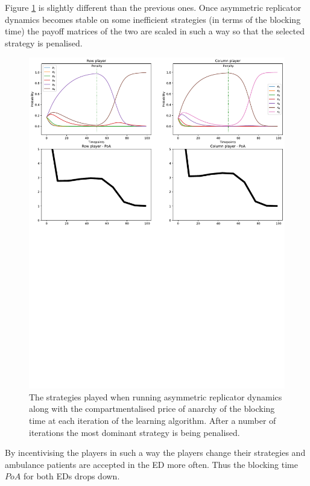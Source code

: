 Figure \ref{fig:ard_penalty} is slightly different than the previous ones.
Once asymmetric replicator dynamics becomes stable on some inefficient 
strategies (in terms of the blocking time) the payoff matrices of the two are
scaled in such a way so that the selected strategy is penalised.

\begin{figure}[H]
    \includegraphics[width=\textwidth, trim=0 400 0 0]{imgs/asymmetric_rd_and_PoA/asymmetric_penalty.pdf}
    \caption{
        The strategies played when running asymmetric replicator dynamics
        along with the compartmentalised price of anarchy of the blocking time 
        at each iteration of the learning algorithm. After a number of 
        iterations the most dominant strategy is being penalised.
    }
    \label{fig:ard_penalty}
\end{figure}

By incentivising the players in such a way the players change their strategies 
and ambulance patients are accepted in the ED more often.
Thus the blocking time \(PoA\) for both EDs drops down. 

